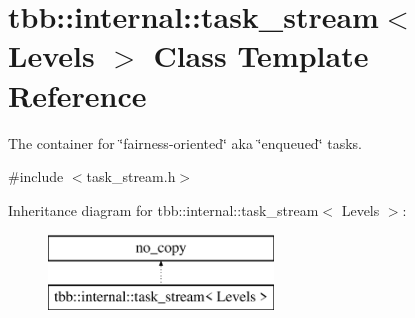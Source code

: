 \hypertarget{classtbb_1_1internal_1_1task__stream}{}\section{tbb\+:\+:internal\+:\+:task\+\_\+stream$<$ Levels $>$ Class Template Reference}
\label{classtbb_1_1internal_1_1task__stream}


The container for \char`\"{}fairness-\/oriented\char`\"{} aka \char`\"{}enqueued\char`\"{} tasks.  




{\ttfamily \#include $<$task\+\_\+stream.\+h$>$}

Inheritance diagram for tbb\+:\+:internal\+:\+:task\+\_\+stream$<$ Levels $>$\+:\begin{figure}[H]
\begin{center}
\leavevmode
\includegraphics[height=2.000000cm]{classtbb_1_1internal_1_1task__stream}
\end{center}
\end{figure}

